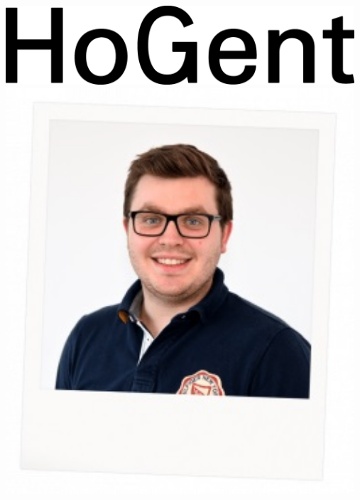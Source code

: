 \documentclass[a0,portrait]{a0poster}
\begin{document}
\begin{minipage}[t]{0.25\linewidth}
\includegraphics[width=13cm,right]{figures/HG-woordmerk.jpg} 
\includegraphics[width=13cm,right]{figures/Laurens.jpg} 
\end{minipage}

\vspace{1cm} %

\end{document}
